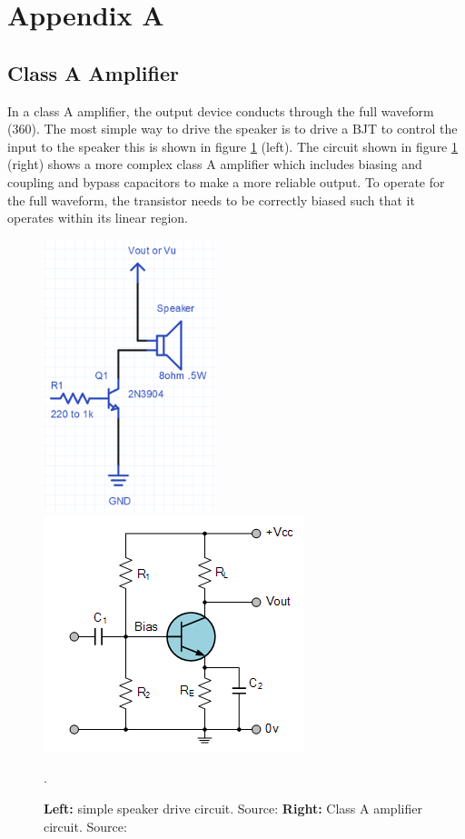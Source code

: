 \documentclass[12pt, a4paper]{article}
\begin{document}
\pagebreak
\printbibliography[title={References}]
\pagebreak
\section*{Appendix A}
\subsection*{Class A Amplifier}
In a class A amplifier, the output device conducts through the full waveform (360\degree). The most simple way to drive the speaker is to drive a BJT to control the input to the speaker this is shown in figure \ref{fig:speakerDriver1} (left). The circuit shown in figure \ref{fig:speakerDriver1} (right) shows a more complex class A amplifier which includes biasing and coupling and bypass capacitors to make a more reliable output. To operate for the full waveform, the transistor needs to be correctly biased such that it operates within its linear region.

\begin{figure} [!htb]
	\includegraphics[width=50mm, scale=0.4]{./Figures/Speaker_Driver_1}
	\includegraphics[scale = 1.0]{./Figures/class_A_amplifier_biasing}
	\caption{\textbf{Left:} simple speaker drive circuit. Source: \cite{speakerDriveSimple} \textbf{Right:} Class A amplifier circuit. Source: \cite{amplifiers}}.
	\label{fig:speakerDriver1}
\end{figure}
\end{document}
